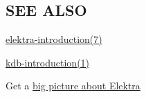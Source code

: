 \subsection*{S\+EE A\+L\+SO}


\begin{DoxyItemize}
\item \hyperlink{md_doc_help_elektra-introduction_doc_help_elektra-introduction_md}{elektra-\/introduction(7)}
\item \hyperlink{md_doc_help_kdb-introduction_doc_help_kdb-introduction_md}{kdb-\/introduction(1)}
\item Get a \hyperlink{doc_BIGPICTURE_md}{big picture about Elektra} 
\end{DoxyItemize}